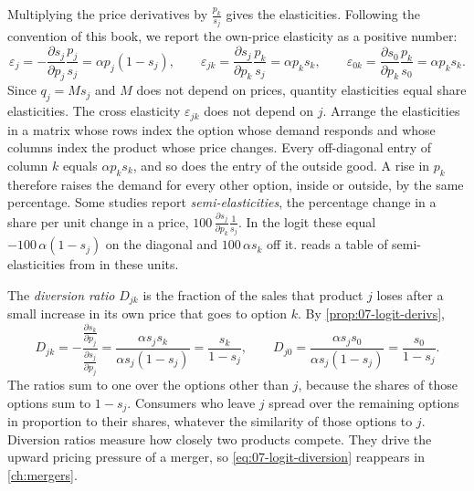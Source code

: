 Multiplying the price derivatives by $\frac{p_k}{s_j}$ gives the elasticities. Following the convention of this
book, we report the own-price elasticity as a positive number:
\begin{equation}\label{eq:07-logit-elast}
  \varepsilon_j = -\frac{\partial s_j}{\partial p_j}\frac{p_j}{s_j} = \alpha p_j(1 - s_j), \qquad
  \varepsilon_{jk} = \frac{\partial s_j}{\partial p_k}\frac{p_k}{s_j} = \alpha p_k s_k, \qquad
  \varepsilon_{0k} = \frac{\partial s_0}{\partial p_k}\frac{p_k}{s_0} = \alpha p_k s_k .
\end{equation}
Since $q_j = M s_j$ and $M$ does not depend on prices, quantity elasticities equal share elasticities. The cross
elasticity $\varepsilon_{jk}$ does not depend on $j$. Arrange the elasticities in a matrix whose rows index the
option whose demand responds and whose columns index the product whose price changes. Every off-diagonal entry
of column $k$ equals $\alpha p_k s_k$, and so does the entry of the outside good. A rise in $p_k$ therefore
raises the demand for every other option, inside or outside, by the same percentage. Some studies report
\emph{semi-elasticities}, the percentage change in a share per unit change in a price,
$100\,\frac{\partial s_j}{\partial p_k}\frac{1}{s_j}$. In the logit these equal $-100\,\alpha(1 - s_j)$ on the
diagonal and $100\,\alpha s_k$ off it.  reads a table of semi-elasticities from
\citet{BerryLevinsohnPakes1995} in these units.

The \emph{diversion ratio} $D_{jk}$ is the fraction of the sales that product $j$ loses after a small increase in
its own price that goes to option $k$. By \cref{prop:07-logit-derivs},
\begin{equation}\label{eq:07-logit-diversion}
  D_{jk} = -\frac{\frac{\partial s_k}{\partial p_j}}{\frac{\partial s_j}{\partial p_j}}
  = \frac{\alpha s_j s_k}{\alpha s_j(1 - s_j)} = \frac{s_k}{1 - s_j}, \qquad
  D_{j0} = \frac{\alpha s_j s_0}{\alpha s_j(1 - s_j)} = \frac{s_0}{1 - s_j} .
\end{equation}
The ratios sum to one over the options other than $j$, because the shares of those options sum to $1 - s_j$.
Consumers who leave $j$ spread over the remaining options in proportion to their shares, whatever the
similarity of those options to $j$. Diversion ratios measure how closely two products compete. They drive the
upward pricing pressure of a merger, so \eqref{eq:07-logit-diversion} reappears in \cref{ch:mergers}.

